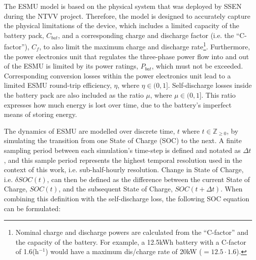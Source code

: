 \nomenclature[J]{$\mu$}{Self-discharge losses of battery, where $\mu \in (0, 1]$}
\nomenclature[J]{$\eta$}{Round-trip efficiency of power electronics, where $\eta \in (0, 1]$}

The ESMU model is based on the physical system that was deployed by SSEN during the NTVV project.
Therefore, the model is designed to accurately capture the physical limitations of the device, which includes a limited capacity of the battery pack, $C_{bat}$, and a corresponding charge and discharge factor (i.e. the ``C-factor''), $C_{f}$, to also limit the maximum charge and discharge rate\footnote{Nominal charge and discharge powers are calculated from the ``C-factor'' and the capacity of the battery. For example, a 12.5kWh battery with a C-factor of 1.6(h$^{-1}$) would have a maximum dis/charge rate of 20kW ($=12.5 \cdot 1.6$).}.
Furthermore, the power electronics unit that regulates the three-phase power flow into and out of the ESMU is limited by its power ratings, $P_{bat}$, which must not be exceeded.
Corresponding conversion losses within the power electronics unit lead to a limited ESMU round-trip efficiency, $\eta$, where $\eta \in (0, 1]$.
Self-discharge losses inside the battery pack are also included as the ratio $\mu$, where $\mu \in (0, 1]$.
This ratio expresses how much energy is lost over time, due to the battery's imperfect means of storing energy.

The dynamics of ESMU are modelled over discrete time, $t$ where $t \in \mathbb{Z}_{\geq0}$, by simulating the transition from one State of Charge (SOC) to the next.
A finite sampling period between each simulation's time-step is defined and notated as $\Delta t$, and this sample period represents the highest temporal resolution used in the context of this work, i.e. sub-half-hourly resolution.
Change in State of Charge, i.e. $\delta SOC(t)$, can then be defined as the difference between the current State of Charge, $SOC(t)$, and the subsequent State of Charge, $SOC(t+\Delta t)$.
When combining this definition with the self-discharge loss, the following SOC equation can be formulated:

